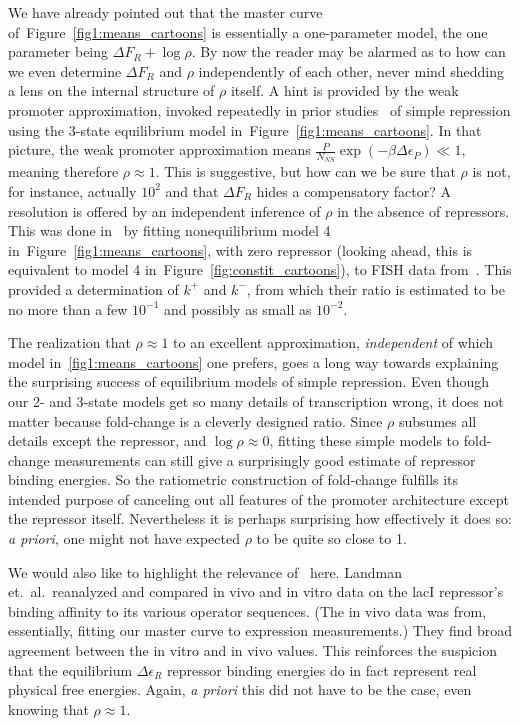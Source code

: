 \documentclass[12pt]{article}%
\newcommand{\fig}[1]{Figure~\ref{#1}}
\begin{document}
We have already pointed out that the master curve
of~\fig{fig1:means_cartoons} is essentially a one-parameter model,
the one parameter being $\Delta F_R + \log\rho$.
By now the reader may be alarmed as to how can we even determine
$\Delta F_R$ and $\rho$ independently of each other, never mind
shedding a lens on the internal structure of $\rho$ itself.
A hint is provided by the weak promoter approximation, invoked
repeatedly in prior studies~\cite{Bintu2005c, Garcia2011a,
Razo-Mejia2018} of simple repression using the 3-state
equilibrium model in~\fig{fig1:means_cartoons}.
In that picture, the weak promoter approximation means
$\frac{P}{N_{NS}}\exp(-\beta\Delta\epsilon_P) \ll 1$,
meaning therefore $\rho\approx1$.
This is suggestive, but how can we be sure that $\rho$ is not,
for instance, actually $10^2$ and that $\Delta F_R$ hides a
compensatory factor?
A resolution is offered by an independent inference of $\rho$ in
the absence of repressors. This was done in~\cite{Razo-Mejia2020}
by fitting nonequilibrium model 4  in~\fig{fig1:means_cartoons},
with zero repressor (looking ahead, this is equivalent to model 4
in~\fig{fig:constit_cartoons}), to FISH data
from~\cite{Brewster2014}. This provided a determination of $k^+$
and $k^-$, from which their ratio is estimated to be no more than
a few $10^{-1}$ and possibly as small as $10^{-2}$.

The realization that $\rho\approx1$ to an excellent
approximation, \textit{independent} of which model
in~\ref{fig1:means_cartoons} one prefers, goes a long way towards
explaining the surprising success of equilibrium models of simple
repression. Even though our 2- and 3-state models get so many
details of transcription wrong, it does not matter because
fold-change is a cleverly designed ratio. Since $\rho$ subsumes
all details except the repressor, and $\log\rho\approx0$, fitting
these simple models to fold-change measurements can still give a
surprisingly good estimate of repressor binding energies. So the
ratiometric construction of fold-change fulfills its intended
purpose of canceling out all features of the promoter
architecture except the repressor itself. Nevertheless it is
perhaps surprising how effectively it does so: \textit{a priori},
one might not have expected $\rho$ to be quite so close to 1.

We would also like to highlight the relevance
of~\cite{Landman2019} here. Landman et.\ al.\ reanalyzed and
compared in vivo and in vitro data on the lacI repressor's
binding affinity to its various operator sequences. (The in vivo
data was from, essentially, fitting our master curve to
expression measurements.) They find broad agreement between the
in vitro and in vivo values. This reinforces the suspicion that
the equilibrium $\Delta\epsilon_R$ repressor binding energies do
in fact represent real physical free energies.
Again, \textit{a priori} this did not have to be the case, even
knowing that $\rho\approx1$.
\end{document}
